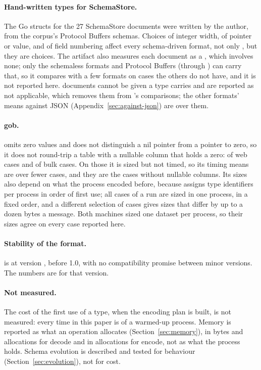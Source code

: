 \paragraph{Hand-written types for SchemaStore.} The Go structs for the 27
SchemaStore documents were written by the author, from the corpus's
Protocol Buffers schemas. Choices of integer width, of pointer or value, and
of field numbering affect every schema-driven format, not only \colbin{},
but they are choices. The artifact also measures each document as a
, which involves none; only the schemaless formats and
Protocol Buffers (through ) can carry that, so it
compares \colbin{} with a few formats on cases the others do not have, and
it is not reported here.
 documents cannot be given a type \colbin{}
carries and are reported as not applicable, which removes them from
\colbin{}'s comparisons; the other formats' means against JSON
(Appendix~\ref{sec:against-json}) are over them.

\paragraph{gob.}  omits zero values and does not distinguish a nil
pointer from a pointer to zero, so it does not round-trip a table with a
nullable column that holds a zero:
 of  web cases and
 of  bulk cases. On those
it is sized but not timed, so its timing means are over fewer cases, and
they are the cases without nullable columns. Its sizes also depend on what
the process encoded before, because  assigns type identifiers per
process in order of first use; all cases of a run are sized in one process,
in a fixed order, and a different selection of cases gives sizes that
differ by up to a dozen bytes a message. Both machines sized one dataset
per process, so their sizes agree on every case reported here.

\paragraph{Stability of the format.} \colbin{} is at version
, before 1.0, with no compatibility promise
between minor versions. The numbers are for that version.

\paragraph{Not measured.} The cost of the first use of a type, when the
encoding plan is built, is not measured: every time in this paper is of a
warmed-up process. Memory is reported as what an operation allocates
(Section~\ref{sec:memory}), in bytes and allocations for decode and in
allocations for encode, not as what the process holds. Schema evolution is described and tested for behaviour
(Section~\ref{sec:evolution}), not for cost.
